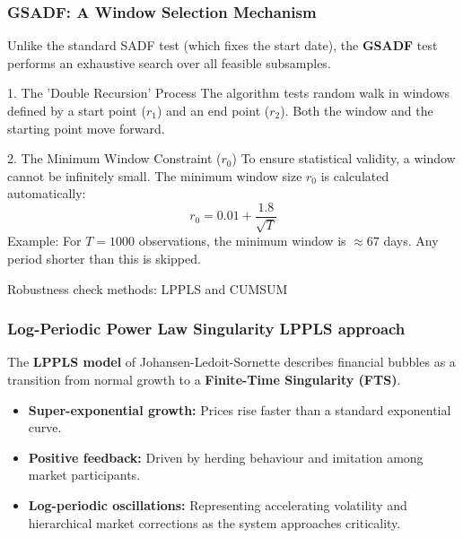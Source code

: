 \documentclass{beamer}
\begin{document}
\begin{frame}
\frametitle{GSADF: A Window Selection Mechanism}
   Unlike the standard SADF test (which fixes the start date), the \textbf{GSADF} test performs an exhaustive search over all feasible subsamples.
    
    \vspace{0.3cm}

    \begin{block}{1. The 'Double Recursion' Process}
        The algorithm tests random walk in windows defined by a start point ($r_1$) and an end point ($r_2$). Both the window and the starting point move forward. 
    \end{block}

    \begin{block}{2. The Minimum Window Constraint ($r_0$)}
        To ensure statistical validity, a window cannot be infinitely small. The minimum window size $r_0$ is calculated automatically:
        \begin{equation*}
            r_0 = 0.01 + \frac{1.8}{\sqrt{T}}
        \end{equation*}
        \footnotesize{Example: For $T = 1000$ observations, the minimum window is $\approx 67$ days. Any period shorter than this is skipped.}
    \end{block}

\end{frame}

\begin{frame}{Robustness check methods: LPPLS and CUMSUM}
  \frametitle{Log-Periodic Power Law Singularity LPPLS approach}
The \textbf{LPPLS model} of Johansen-Ledoit-Sornette \citep{sornette2003why} describes financial bubbles as a transition from normal growth to a \textbf{Finite-Time Singularity (FTS)}.
    
    \vspace{0.3cm}
    \begin{itemize}
        \item \textbf{Super-exponential growth:} Prices rise faster than a standard exponential curve.
        \item \textbf{Positive feedback:} Driven by herding behaviour and imitation among market participants.
        \item \textbf{Log-periodic oscillations:} Representing accelerating volatility and hierarchical market corrections as the system approaches criticality.
    \end{itemize}
\end{frame}
\end{document}
